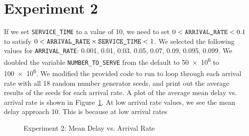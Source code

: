 \section*{Experiment 2}
If we set \texttt{SERVICE\_TIME} to a value of 10, we need to set $0 < \text{\texttt{ARRIVAL\_RATE}} < 0.1$ to satisfy $0 < \text{\texttt{ARRIVAL\_RATE}} \times \text{\texttt{SERVICE\_TIME}} < 1$. We selected the following values for \texttt{ARRIVAL\_RATE}: 0.001, 0.01, 0.03, 0.05, 0.07, 0.09, 0.095, 0.099. We doubled the variable \texttt{NUMBER\_TO\_SERVE} from the default to \num{50e6} to \num{100e6}. We modified the provided code to run to loop through each arrival rate with all 18 random number generator seeds, and print out the average results of the seeds for each arrival rate. A plot of the average mean delay vs. arrival rate is shown in Figure~\ref{fig:exp2}. At low arrival rate values, we see the mean delay approach 10. This is because at low arrival rates

\begin{figure}[h]
\centering
{}
\caption{Experiment 2: Mean Delay vs. Arrival Rate}
\label{fig:exp2}
\end{figure}